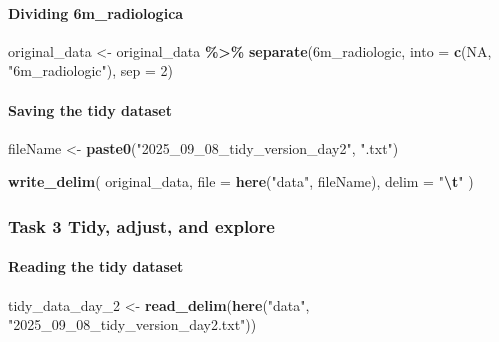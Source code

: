 \documentclass[
]{article}
\newenvironment{Shaded}{\begin{snugshade}}{\end{snugshade}}
\newcommand{\AttributeTok}[1]{\textcolor[rgb]{0.13,0.29,0.53}{#1}}
\newcommand{\ConstantTok}[1]{\textcolor[rgb]{0.56,0.35,0.01}{#1}}
\newcommand{\DecValTok}[1]{\textcolor[rgb]{0.00,0.00,0.81}{#1}}
\newcommand{\FunctionTok}[1]{\textcolor[rgb]{0.13,0.29,0.53}{\textbf{#1}}}
\newcommand{\NormalTok}[1]{#1}
\newcommand{\OtherTok}[1]{\textcolor[rgb]{0.56,0.35,0.01}{#1}}
\newcommand{\SpecialCharTok}[1]{\textcolor[rgb]{0.81,0.36,0.00}{\textbf{#1}}}
\newcommand{\StringTok}[1]{\textcolor[rgb]{0.31,0.60,0.02}{#1}}
\begin{document}
\paragraph{Dividing 6m\_radiologica}\label{dividing-6m_radiologica}

\begin{Shaded}
\begin{Highlighting}[]
\NormalTok{original\_data }\OtherTok{\textless{}{-}}\NormalTok{ original\_data }\SpecialCharTok{\%\textgreater{}\%} 
  \FunctionTok{separate}\NormalTok{(}\StringTok{\textasciigrave{}}\AttributeTok{6m\_radiologic}\StringTok{\textasciigrave{}}\NormalTok{, }\AttributeTok{into =} \FunctionTok{c}\NormalTok{(}\ConstantTok{NA}\NormalTok{, }\StringTok{"6m\_radiologic"}\NormalTok{), }\AttributeTok{sep =} \DecValTok{2}\NormalTok{)}
\end{Highlighting}
\end{Shaded}

\paragraph{Saving the tidy dataset}\label{saving-the-tidy-dataset}

\begin{Shaded}
\begin{Highlighting}[]
\NormalTok{fileName }\OtherTok{\textless{}{-}} \FunctionTok{paste0}\NormalTok{(}\StringTok{"2025\_09\_08\_tidy\_version\_day2"}\NormalTok{, }\StringTok{".txt"}\NormalTok{)}

\FunctionTok{write\_delim}\NormalTok{(}
\NormalTok{  original\_data, }
  \AttributeTok{file =} \FunctionTok{here}\NormalTok{(}\StringTok{"data"}\NormalTok{, fileName),}
  \AttributeTok{delim =} \StringTok{"}\SpecialCharTok{\textbackslash{}t}\StringTok{"}
\NormalTok{)}
\end{Highlighting}
\end{Shaded}

\subsubsection{Task 3 Tidy, adjust, and
explore}\label{task-3-tidy-adjust-and-explore}

\paragraph{Reading the tidy dataset}\label{reading-the-tidy-dataset}

\begin{Shaded}
\begin{Highlighting}[]
\NormalTok{tidy\_data\_day\_2 }\OtherTok{\textless{}{-}} \FunctionTok{read\_delim}\NormalTok{(}\FunctionTok{here}\NormalTok{(}\StringTok{"data"}\NormalTok{, }\StringTok{"2025\_09\_08\_tidy\_version\_day2.txt"}\NormalTok{))}
\end{Highlighting}
\end{Shaded}
\end{document}

